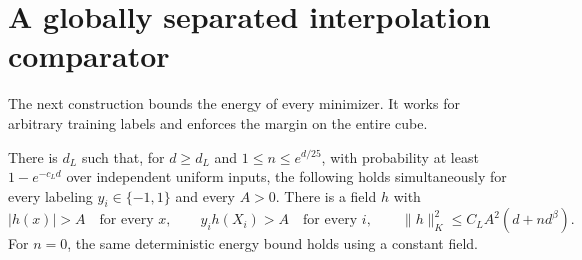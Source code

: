 \section{A globally separated interpolation comparator}
\label{sec:comparator}
The next construction bounds the energy of every minimizer. It works
for arbitrary training labels and enforces the margin on the entire cube.

\begin{lemma}\label{lem:comparator}
There is $d_L$ such that, for $d\ge d_L$ and $1\le n\le e^{d/25}$, with
probability at least $1-e^{-c_Ld}$
over independent uniform inputs, the following holds simultaneously for
every labeling $y_i\in\{-1,1\}$ and every $A>0$.
There is a field $h$ with
\[
 |h(x)|>A\quad\text{for every }x,\qquad
 y_i h(X_i)>A\quad\text{for every }i,
 \qquad \|h\|_K^2\le C_L A^2(d+n d^\beta).
\]
For $n=0$, the same deterministic energy bound holds using a constant field.
\end{lemma}
